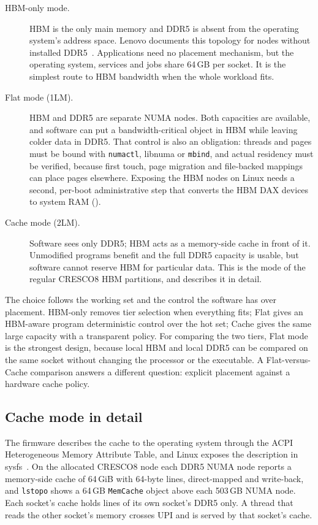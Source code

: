 \begin{description}
  \item[HBM-only mode.] HBM is the only main memory and DDR5 is absent
  from the operating system's address space.  Lenovo documents this
  topology for nodes without installed DDR5~\cite{lp1738}.  Applications
  need no placement mechanism, but the operating system, services and
  jobs share 64\,GB per socket.  It is the simplest route to HBM
  bandwidth when the whole workload fits.

  \item[Flat mode (1LM).] HBM and DDR5 are separate NUMA nodes.  Both
  capacities are available, and software can put a bandwidth-critical
  object in HBM while leaving colder data in DDR5.  That control is also
  an obligation: threads and pages must be bound with \texttt{numactl},
  libnuma or \texttt{mbind}, and actual residency must be verified,
  because first touch, page migration and file-backed mappings can place
  pages elsewhere.  Exposing the HBM nodes on Linux needs a second,
  per-boot administrative step that converts the HBM DAX devices to
  system RAM ().

  \item[Cache mode (2LM).] Software sees only DDR5; HBM acts as a
  memory-side cache in front of it.  Unmodified programs benefit and the
  full DDR5 capacity is usable, but software cannot reserve HBM for
  particular data.  This is the mode of the regular CRESCO8 HBM
  partitions, and  describes it in detail.
\end{description}

The choice follows the working set and the control the software has
over placement.  HBM-only removes tier selection when everything fits;
Flat gives an HBM-aware program deterministic control over the hot set;
Cache gives the same large capacity with a transparent policy.  For
comparing the two tiers, Flat mode is the strongest design, because local
HBM and local DDR5 can be compared on the same socket without changing
the processor or the executable.  A Flat-versus-Cache comparison answers
a different question: explicit placement against a hardware cache policy.

\subsection{Cache mode in detail}
\label{sec:cache-mode}

The firmware describes the cache to the operating system through the
ACPI Heterogeneous Memory Attribute Table, and Linux exposes the
description in sysfs~\cite{linuxnumaperf}.  On the allocated CRESCO8 node
each DDR5 NUMA node reports a memory-side cache of 64\,GiB with 64-byte
lines, direct-mapped and write-back, and \texttt{lstopo} shows a 64\,GB
\texttt{MemCache} object above each 503\,GB NUMA node.  Each socket's
cache holds lines of its own socket's DDR5 only.  A thread that reads the
other socket's memory crosses UPI and is served by that socket's cache.

